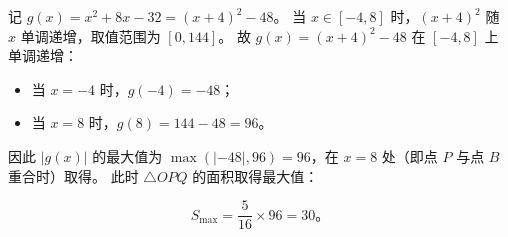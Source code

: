 \begin{answer}
记 $g(x) = x^2 + 8x - 32 = (x + 4)^2 - 48$。
当 $x \in [-4, 8]$ 时，$(x + 4)^2$ 随 $x$ 单调递增，取值范围为 $[0, 144]$。
故 $g(x) = (x + 4)^2 - 48$ 在 $[-4, 8]$ 上单调递增：
\begin{itemize}
\item 当 $x = -4$ 时，$g(-4) = -48$；
\item 当 $x = 8$ 时，$g(8) = 144 - 48 = 96$。
\end{itemize}
因此 $|g(x)|$ 的最大值为 $\max(|-48|, 96) = 96$，在 $x = 8$ 处（即点 $P$ 与点 $B$ 重合时）取得。
此时 $\triangle OPQ$ 的面积取得最大值：

\nopagebreak[4]
\[
S_{\max} = \dfrac{5}{16} \times 96 = 30\mbox{。}
\]



\end{answer}

